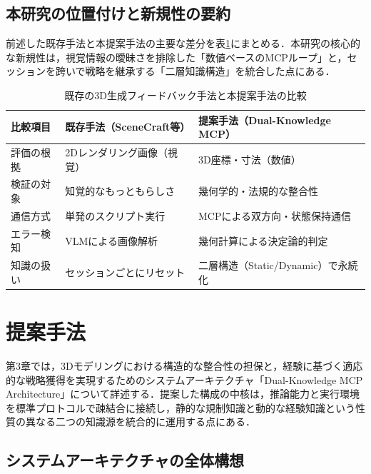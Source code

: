 \documentclass[dvipdfmx, a4paper, 9pt]{deimj}
\begin{document}
\subsection{本研究の位置付けと新規性の要約}

前述した既存手法と本提案手法の主要な差分を表\ref{tab:comparison}にまとめる．本研究の核心的な新規性は，視覚情報の曖昧さを排除した「数値ベースのMCPループ」と，セッションを跨いで戦略を継承する「二層知識構造」を統合した点にある．

\begin{table}[ht]
  \caption{既存の3D生成フィードバック手法と本提案手法の比較}
  \label{tab:comparison}
  \centering
  \small
  \begin{tabularx}{\columnwidth}{lXX}
    \toprule
    比較項目 & 既存手法（SceneCraft等） & 提案手法（Dual-Knowledge MCP）\\
    \midrule
    評価の根拠 & 2Dレンダリング画像（視覚） & 3D座標・寸法（数値）\\
    検証の対象 & 知覚的なもっともらしさ & 幾何学的・法規的な整合性\\
    通信方式 & 単発のスクリプト実行 & MCPによる双方向・状態保持通信\\
    エラー検知 & VLMによる画像解析 & 幾何計算による決定論的判定\\
    知識の扱い & セッションごとにリセット & 二層構造（Static/Dynamic）で永続化\\
    \bottomrule
  \end{tabularx}
\end{table}

\section{提案手法}

第3章では，3Dモデリングにおける構造的な整合性の担保と，経験に基づく適応的な戦略獲得を実現するためのシステムアーキテクチャ「Dual-Knowledge MCP Architecture」について詳述する．提案した構成の中核は，推論能力と実行環境を標準プロトコルで疎結合に接続し，静的な規制知識と動的な経験知識という性質の異なる二つの知識源を統合的に運用する点にある．

\subsection{システムアーキテクチャの全体構想}
\end{document}

